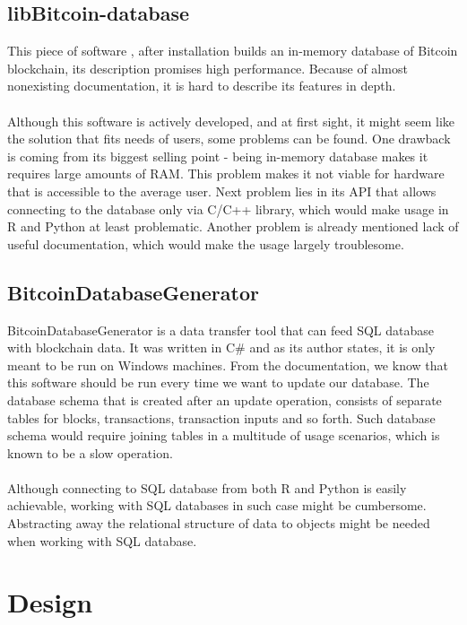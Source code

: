 \documentclass[12pt, en, eng, oneside, final]{mgr}
\begin{document}
\section{libBitcoin-database}

This piece of software \cite{libbitcoin-database}, after installation builds an in-memory database of Bitcoin blockchain, its description promises high performance. Because of almost nonexisting documentation, it is hard to describe its features in depth.
\\
\\
Although this software is actively developed, and at first sight, it might seem like the solution that fits needs of users, some problems can be found. One drawback is coming from its biggest selling point - being in-memory database makes it requires large amounts of RAM. This problem makes it not viable for hardware that is accessible to the average user. Next problem lies in its API that allows connecting to the database only via C/C++ library, which would make usage in R and Python at least problematic. Another problem is already mentioned lack of useful documentation, which would make the usage largely troublesome.

\section{BitcoinDatabaseGenerator}

BitcoinDatabaseGenerator \cite{BitcoinDatabaseGenerator} is a data transfer tool that can feed SQL database with blockchain data. It was written in C\# and as its author states, it is only meant to be run on Windows machines. From the documentation, we know that this software should be run every time we want to update our database. The database schema that is created after an update operation, consists of separate tables for blocks, transactions, transaction inputs and so forth. Such database schema would require joining tables in a multitude of usage scenarios, which is known to be a slow operation.
\\
\\
Although connecting to SQL database from both R and Python is easily achievable, working with SQL databases in such case might be cumbersome. Abstracting away the relational structure of data to objects might be needed when working with SQL database. 


\chapter{Design}
\end{document}
